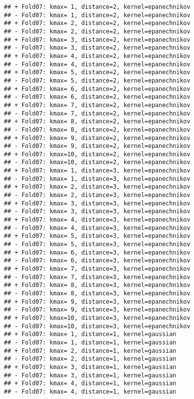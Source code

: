 \documentclass[
]{article}
\begin{document}
\begin{verbatim}
## + Fold07: kmax= 1, distance=2, kernel=epanechnikov 
## - Fold07: kmax= 1, distance=2, kernel=epanechnikov 
## + Fold07: kmax= 2, distance=2, kernel=epanechnikov 
## - Fold07: kmax= 2, distance=2, kernel=epanechnikov 
## + Fold07: kmax= 3, distance=2, kernel=epanechnikov 
## - Fold07: kmax= 3, distance=2, kernel=epanechnikov 
## + Fold07: kmax= 4, distance=2, kernel=epanechnikov 
## - Fold07: kmax= 4, distance=2, kernel=epanechnikov 
## + Fold07: kmax= 5, distance=2, kernel=epanechnikov 
## - Fold07: kmax= 5, distance=2, kernel=epanechnikov 
## + Fold07: kmax= 6, distance=2, kernel=epanechnikov 
## - Fold07: kmax= 6, distance=2, kernel=epanechnikov 
## + Fold07: kmax= 7, distance=2, kernel=epanechnikov 
## - Fold07: kmax= 7, distance=2, kernel=epanechnikov 
## + Fold07: kmax= 8, distance=2, kernel=epanechnikov 
## - Fold07: kmax= 8, distance=2, kernel=epanechnikov 
## + Fold07: kmax= 9, distance=2, kernel=epanechnikov 
## - Fold07: kmax= 9, distance=2, kernel=epanechnikov 
## + Fold07: kmax=10, distance=2, kernel=epanechnikov 
## - Fold07: kmax=10, distance=2, kernel=epanechnikov 
## + Fold07: kmax= 1, distance=3, kernel=epanechnikov 
## - Fold07: kmax= 1, distance=3, kernel=epanechnikov 
## + Fold07: kmax= 2, distance=3, kernel=epanechnikov 
## - Fold07: kmax= 2, distance=3, kernel=epanechnikov 
## + Fold07: kmax= 3, distance=3, kernel=epanechnikov 
## - Fold07: kmax= 3, distance=3, kernel=epanechnikov 
## + Fold07: kmax= 4, distance=3, kernel=epanechnikov 
## - Fold07: kmax= 4, distance=3, kernel=epanechnikov 
## + Fold07: kmax= 5, distance=3, kernel=epanechnikov 
## - Fold07: kmax= 5, distance=3, kernel=epanechnikov 
## + Fold07: kmax= 6, distance=3, kernel=epanechnikov 
## - Fold07: kmax= 6, distance=3, kernel=epanechnikov 
## + Fold07: kmax= 7, distance=3, kernel=epanechnikov 
## - Fold07: kmax= 7, distance=3, kernel=epanechnikov 
## + Fold07: kmax= 8, distance=3, kernel=epanechnikov 
## - Fold07: kmax= 8, distance=3, kernel=epanechnikov 
## + Fold07: kmax= 9, distance=3, kernel=epanechnikov 
## - Fold07: kmax= 9, distance=3, kernel=epanechnikov 
## + Fold07: kmax=10, distance=3, kernel=epanechnikov 
## - Fold07: kmax=10, distance=3, kernel=epanechnikov 
## + Fold07: kmax= 1, distance=1, kernel=gaussian 
## - Fold07: kmax= 1, distance=1, kernel=gaussian 
## + Fold07: kmax= 2, distance=1, kernel=gaussian 
## - Fold07: kmax= 2, distance=1, kernel=gaussian 
## + Fold07: kmax= 3, distance=1, kernel=gaussian 
## - Fold07: kmax= 3, distance=1, kernel=gaussian 
## + Fold07: kmax= 4, distance=1, kernel=gaussian 
## - Fold07: kmax= 4, distance=1, kernel=gaussian 

\end{verbatim}
\end{document}
